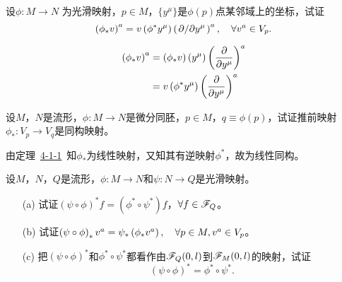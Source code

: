 \begin{xiti}
	\item 设$\phi\colon M\rightarrow N$ 为光滑映射，$p \in M $，$\{ y^\mu \}$是$\phi(p)$点某邻域上的坐标，试证
	\begin{displaymath}
	\tensor{\left(\phi_* v\right)}{^a}= v \left( \phi^* y^\mu \right) \tensor{\left(\pd{y^\mu}\right)}{^a}\qc \forall \tensor{v}{^a} \in V_p.
	\end{displaymath}
	
	\begin{zm}
		\begin{align*}
		\tensor{\left(\phi_* v\right)}{^a}&= \left(\phi_* v\right) (y^\mu) \tensor{\left(\pdv{y^\mu}\right)}{^a}\\
		&=v \left(\phi^* y^\mu\right) \tensor{\left(\pdv{y^\mu}\right)}{^a}
		\end{align*}
	\end{zm}
	
	\item 设$M$，$N$是流形，$\phi\colon M\rightarrow N$是微分同胚，$p\in M$，$q\equiv \phi(p)$，试证推前映射$\phi_* \colon V_p \rightarrow V_q $是同构映射。
	
	\begin{zm}
	由定理~\hyperlink{thm4.1.1}{4-1-1}~知$\phi_*$为线性映射，又知其有逆映射$\phi^*$，故为线性同构。
	\end{zm}
	
	\item 设$M$，$N$，$Q$是流形，$\phi\colon M \rightarrow N $和$\psi \colon N \rightarrow Q $是光滑映射。
	\begin{enumerate}
		\item[(a)] 试证$\left( \psi \circ \phi \right)^* f= \left(\phi^* \circ \psi^* \right) f $，$\forall f\in \mathscr{F}_Q $。
		\item[(b)] 试证$\left(\psi \circ \phi \right)_* \tensor{v}{^a}= \psi_*\left( \phi_* \tensor{v}{^a} \right) \qc \forall p\in M,\tensor{v}{^a}\in V_p $。
		\item[(c)] \hypertarget{4.5.c}{}把$\left( \psi \circ \phi \right)^* $和$\phi^* \circ \psi^* $都看作由$\mathscr{F}_Q(0,l) $到$\mathscr{F}_M(0,l) $的映射，试证\[ \left( \psi \circ \phi \right)^*= \phi^* \circ \psi^*. \]
	\end{enumerate}
	

\end{xiti}
